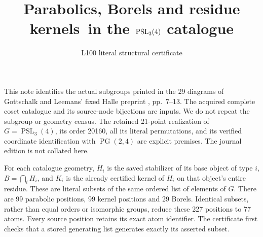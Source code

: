 \documentclass[11pt]{article}
\title{Parabolics, Borels and residue kernels\ in the $\PSL_3(4)$ catalogue}
\author{L100 literal structural certificate}\date{}
\newcommand{\PSL}{\operatorname{PSL}}\newcommand{\SL}{\operatorname{SL}}
\newcommand{\PG}{\operatorname{PG}}\newcommand{\E}{\mathrm E}
\begin{document}
\maketitle
This note identifies the actual subgroups printed in the 29 diagrams of
Gottschalk and Leemans' fixed Halle preprint \cite{GL}, pp.~7--13.
The acquired complete coset catalogue and its source-node bijections are
inputs. We do not repeat the subgroup or geometry census. The retained
21-point realization of $G=\PSL_3(4)$, its order 20160, all its literal
permutations, and its verified coordinate identification with $\PG(2,4)$
are explicit premises. The journal edition is not collated here.

For each catalogue geometry, $H_i$ is the saved stabilizer of its base
object of type $i$, $B=\bigcap_iH_i$, and $K_i$ is the already certified
kernel of $H_i$ on that object's entire residue. These are literal subsets
of the same ordered list of elements of $G$. There are 99 parabolic
positions, 99 kernel positions and 29 Borels. Identical subsets, rather
than equal orders or isomorphic groups, reduce these 227 positions to
77 atoms. Every source position retains its exact atom identifier.
The certificate first checks that a stored generating list generates
exactly its asserted subset.
\end{document}
